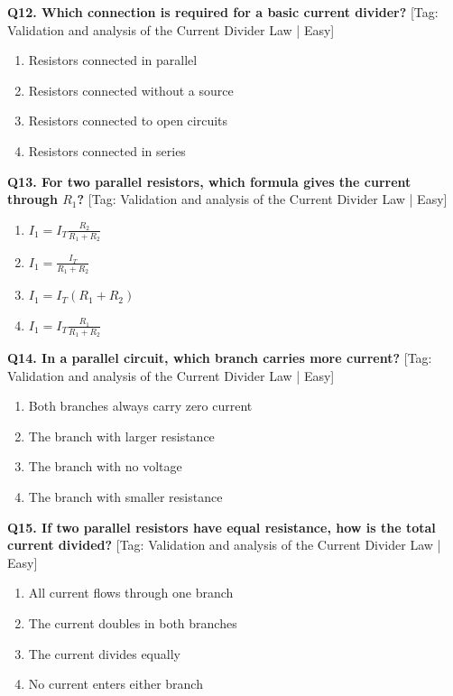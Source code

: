 \noindent\textbf{Q12. Which connection is required for a basic current divider?} \hfill [Tag: Validation and analysis of the Current Divider Law | Easy]
\begin{enumerate}[label=(\alph*),topsep=2pt,itemsep=1pt,partopsep=0pt,parsep=0pt]
    \item {Resistors connected in parallel}
    \item {Resistors connected without a source}
    \item {Resistors connected to open circuits}
    \item {Resistors connected in series}
\end{enumerate}
\vspace{2mm}

\noindent\textbf{Q13. For two parallel resistors, which formula gives the current through $R_1$?} \hfill [Tag: Validation and analysis of the Current Divider Law | Easy]
\begin{enumerate}[label=(\alph*),topsep=2pt,itemsep=1pt,partopsep=0pt,parsep=0pt]
    \item {$I_1 = I_T \frac{R_2}{R_1 + R_2}$}
    \item {$I_1 = \frac{I_T}{R_1 + R_2}$}
    \item {$I_1 = I_T(R_1 + R_2)$}
    \item {$I_1 = I_T \frac{R_1}{R_1 + R_2}$}
\end{enumerate}
\vspace{2mm}

\noindent\textbf{Q14. In a parallel circuit, which branch carries more current?} \hfill [Tag: Validation and analysis of the Current Divider Law | Easy]
\begin{enumerate}[label=(\alph*),topsep=2pt,itemsep=1pt,partopsep=0pt,parsep=0pt]
    \item {Both branches always carry zero current}
    \item {The branch with larger resistance}
    \item {The branch with no voltage}
    \item {The branch with smaller resistance}
\end{enumerate}
\vspace{2mm}

\noindent\textbf{Q15. If two parallel resistors have equal resistance, how is the total current divided?} \hfill [Tag: Validation and analysis of the Current Divider Law | Easy]
\begin{enumerate}[label=(\alph*),topsep=2pt,itemsep=1pt,partopsep=0pt,parsep=0pt]
    \item {All current flows through one branch}
    \item {The current doubles in both branches}
    \item {The current divides equally}
    \item {No current enters either branch}
\end{enumerate}
\vspace{2mm}

